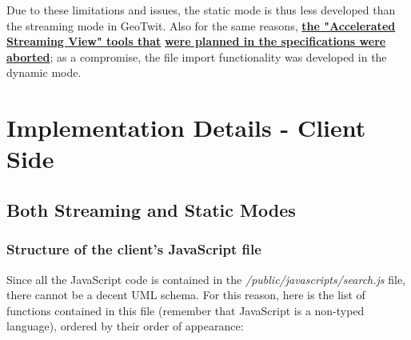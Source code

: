 \documentclass[a4paper,11pt]{report}
\begin{document}
Due to these limitations and issues, the static mode is thus less developed than the streaming mode in GeoTwit. Also for the same reasons, \textbf{\underline{the "Accelerated Streaming View" tools that}} \textbf{\underline{were planned in the specifications were aborted}}; as a compromise, the file import functionality was developed in the dynamic mode.
\bigskip

\section{Implementation Details - Client Side}
\subsection{Both Streaming and Static Modes}
\subsubsection{Structure of the client's JavaScript file}
Since all the JavaScript code is contained in the \emph{/public/javascripts/search.js} file, there cannot be a decent UML schema. For this reason, here is the list of functions contained in this file (remember that JavaScript is a non-typed language), ordered by their order of appearance:
\end{document}
